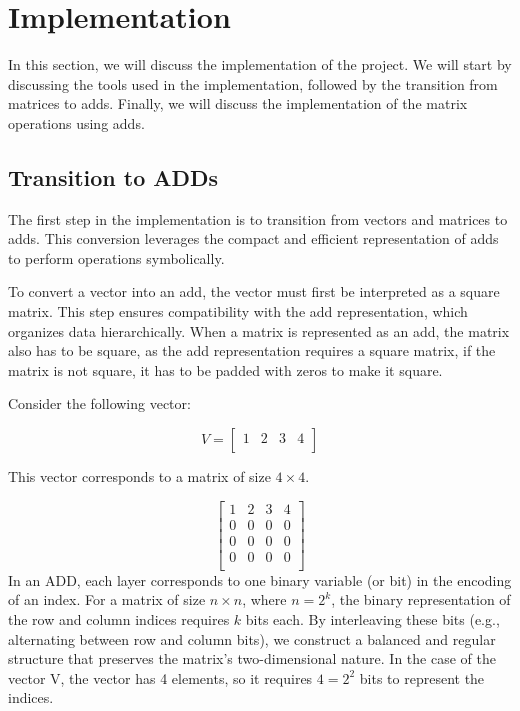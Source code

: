 \section{Implementation}\label{sec:implementation}
In this section, we will discuss the implementation of the project.
We will start by discussing the tools used in the implementation, followed by the transition from matrices to \glspl{add}.
Finally, we will discuss the implementation of the matrix operations using \glspl{add}.

\subsection{Transition to ADDs}\label{subsec:transition-to-adds}
The first step in the implementation is to transition from vectors and matrices to \glspl{add}.
This conversion leverages the compact and efficient representation of \glspl{add} to perform operations symbolically.

To convert a vector into an \gls{add}, the vector must first be interpreted as a square matrix.
This step ensures compatibility with the \gls{add} representation, which organizes data hierarchically.
When a matrix is represented as an \gls{add}, the matrix also has to be square, as the \gls{add} representation requires a square matrix, if the matrix is not square, it has to be padded with zeros to make it square.

Consider the following vector:

\[
    V=
    \begin{bmatrix}
        1 & 2 & 3 & 4 \\
    \end{bmatrix}
\]

This vector corresponds to a matrix of size $4 \times 4$.

\[
    \begin{bmatrix}
        1 & 2 & 3 & 4 \\
        0 & 0 & 0 & 0 \\
        0 & 0 & 0 & 0 \\
        0 & 0 & 0 & 0 \\
    \end{bmatrix}
\]
In an ADD, each layer corresponds to one binary variable (or bit) in the encoding of an index. 
For a matrix of size $n \times n$, where $n = 2^k$, the binary representation of the row and column indices requires $k$ bits each. 
By interleaving these bits (e.g., alternating between row and column bits), we construct a balanced and regular structure that preserves the matrix's two-dimensional nature.
In the case of the vector V, the vector has 4 elements, so it requires $4 = 2^2$ bits to represent the indices.

